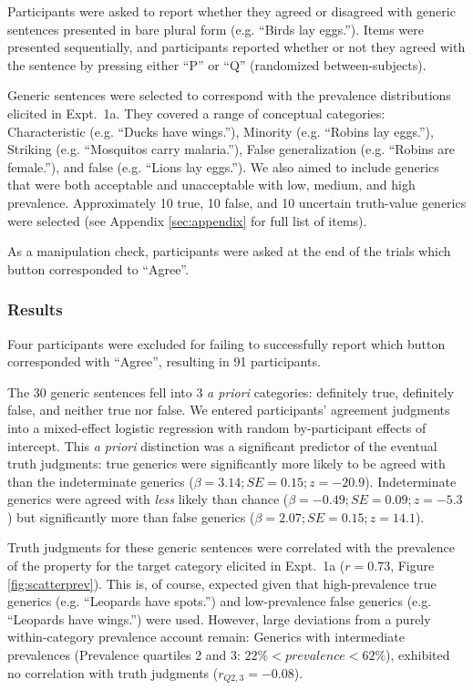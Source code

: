 \documentclass[10pt,letterpaper]{article}
\begin{document}
Participants were asked to report whether they agreed or disagreed with generic sentences presented in bare plural form (e.g. ``Birds lay eggs.''). 
Items were presented sequentially, and participants reported whether or not they agreed with the sentence by pressing either ``P'' or ``Q'' (randomized between-subjects). 

Generic sentences were selected to correspond with the prevalence distributions elicited in Expt.~1a. 
They covered a range of conceptual categories: Characteristic (e.g. ``Ducks have wings.''), Minority (e.g. ``Robins lay eggs.''), Striking (e.g. ``Mosquitos carry malaria.''), False generalization (e.g. ``Robins are female.''), and false (e.g. ``Lions lay eggs.'').
We also aimed to include generics that were both acceptable and unacceptable with low, medium, and high prevalence.
Approximately 10 true, 10 false, and 10 uncertain truth-value generics were selected (see Appendix \ref{sec:appendix} for full list of items).

As a manipulation check, participants were asked at the end of the trials which button corresponded to ``Agree''.

\subsubsection{Results}

Four participants were excluded for failing to successfully report which button corresponded with ``Agree'', resulting in 91 participants.



The 30 generic sentences fell into 3 \emph{a priori} categories: definitely true, definitely false, and neither true nor false. 
We entered participants' agreement judgments into a mixed-effect logistic regression with random by-participant effects of intercept. 
This \emph{a priori} distinction was a significant predictor of the eventual truth judgments: true generics were significantly more likely to be agreed with than the indeterminate generics ($\beta = 3.14; SE = 0.15; z = -20.9$).
Indeterminate generics were agreed with \emph{less} likely than chance ($\beta = -0.49; SE = 0.09; z = -5.3$) but significantly more than false generics ($\beta = 2.07; SE = 0.15; z = 14.1$).

Truth judgments for these generic sentences were correlated with the prevalence of the property for the target category elicited in Expt.~1a ($r = 0.73$, Figure \ref{fig:scatterprev}). This is, of course, expected given that high-prevalence true generics (e.g. ``Leopards have spots.'') and low-prevalence false generics (e.g. ``Leopards have wings.'') were used. 
However, large deviations from a purely within-category prevalence account remain: Generics with intermediate prevalences (Prevalence quartiles 2 and 3: $ 22\% < prevalence < 62\%$), exhibited no correlation with truth judgments ($r_{Q2,3} = -0.08$).
\end{document}
